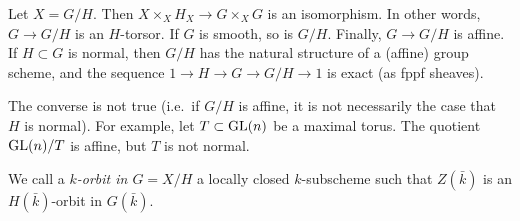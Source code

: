 \documentclass{article}
\begin{document}
Let $X=G/H$. Then $X\times_X H_X\to G\times_X G$ is an isomorphism. In other 
words, $G\to G/H$ is an $H$-torsor. If $G$ is smooth, so is $G/H$. Finally, 
$G\to G/H$ is affine. If $H\subset G$ is normal, then $G/H$ has the natural 
structure of a (affine) group scheme, and the sequence 
$1\to H \to G \to G/H \to 1$ is exact (as fppf sheaves). 

The converse is not true (i.e.\ if $G/H$ is affine, it is not necessarily the 
case that $H$ is normal). For example, let $T\subset \operatorname{GL}(n)$ be a 
maximal torus. The quotient $\operatorname{GL}(n)/T$ is affine, but $T$ is not 
normal. 

We call a \emph{$k$-orbit in $G=X/H$} a locally closed $k$-subscheme such that 
$Z(\bar k)$ is an $H(\bar k)$-orbit in $G(\bar k)$. 







\end{document}
